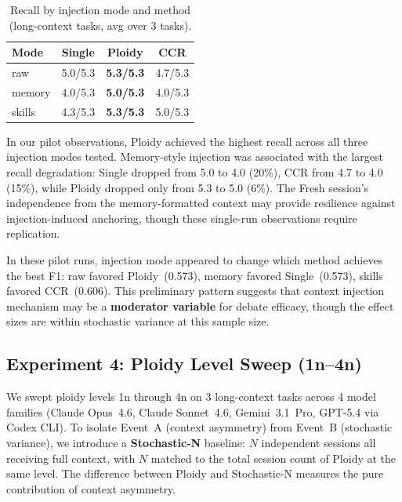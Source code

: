 \documentclass[11pt]{article}
\begin{document}
\begin{table}[H]
\centering
\caption{Recall by injection mode and method (long-context tasks, avg over 3 tasks).}
\label{tab:injection-recall}
\small
\begin{tabular}{@{}lccc@{}}
\toprule
\textbf{Mode} & \textbf{Single} & \textbf{Ploidy} & \textbf{CCR} \\
\midrule
raw    & 5.0/5.3 & \textbf{5.3/5.3} & 4.7/5.3 \\
memory & 4.0/5.3 & \textbf{5.0/5.3} & 4.0/5.3 \\
skills & 4.3/5.3 & \textbf{5.3/5.3} & 5.0/5.3 \\
\bottomrule
\end{tabular}
\end{table}

In our pilot observations, Ploidy achieved the highest recall across all three injection modes tested. Memory-style injection was associated with the largest recall degradation: Single dropped from 5.0 to 4.0 (20\%), CCR from 4.7 to 4.0 (15\%), while Ploidy dropped only from 5.3 to 5.0 (6\%). The Fresh session's independence from the memory-formatted context may provide resilience against injection-induced anchoring, though these single-run observations require replication.

In these pilot runs, injection mode appeared to change which method achieves the best F1: raw favored Ploidy~(0.573), memory favored Single~(0.573), skills favored CCR~(0.606). This preliminary pattern suggests that context injection mechanism may be a \textbf{moderator variable} for debate efficacy, though the effect sizes are within stochastic variance at this sample size.

\subsection{Experiment 4: Ploidy Level Sweep (1n--4n)}
\label{sec:ploidy-sweep}

We swept ploidy levels 1n through 4n on 3 long-context tasks across 4 model families (Claude Opus~4.6, Claude Sonnet~4.6, Gemini~3.1~Pro, GPT-5.4 via Codex CLI). To isolate Event~A (context asymmetry) from Event~B (stochastic variance), we introduce a \textbf{Stochastic-N} baseline: $N$ independent sessions all receiving full context, with $N$ matched to the total session count of Ploidy at the same level. The difference between Ploidy and Stochastic-N measures the pure contribution of context asymmetry.
\end{document}
